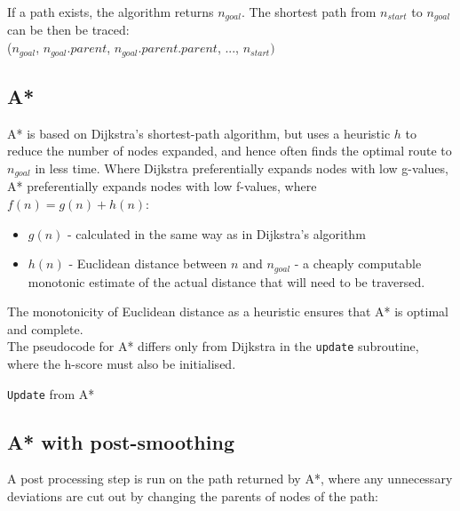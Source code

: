 \documentclass[12pt,notitlepage]{report}
\begin{document}
\noindent
If a path exists, the algorithm returns $n_{goal}$. The shortest path from {$n_{start}$} to {$n_{goal}$} can be then be traced: \\({$n_{goal}$}, {$n_{goal}.parent$}, {$n_{goal}.parent.parent$}, ..., {$n_{start})$}

\subsection {A*}

A* is based on Dijkstra's shortest-path algorithm, but uses a heuristic {$h$} to reduce the number of nodes expanded, and hence often finds the optimal route to {$n_{goal}$} in less time. Where Dijkstra preferentially expands nodes with low g-values, A* preferentially expands nodes with low f-values, where {$f(n) = g(n) + h(n)$}: 
\begin{itemize}
\item {\em {$g(n)$}} - calculated in the same way as in Dijkstra's algorithm
\item {\em {$h(n)$}} - Euclidean distance between {$n$} and {$n_{goal}$}  - a cheaply computable monotonic estimate of the actual distance that will need to be traversed.
\end{itemize}
The monotonicity of Euclidean distance as a heuristic ensures that A* is optimal and complete. \\

\noindent
The pseudocode for A* differs only from Dijkstra in the {\tt update} subroutine, where the h-score must also be initialised.

\begin{algorithm}[htp]
  \SetAlgoLined\DontPrintSemicolon
  \caption{{\tt Update} from {\sc A*}}
\end{algorithm} 

\subsection {A* with post-smoothing}

A post processing step is run on the path returned by A*, where any unnecessary deviations are cut out by changing the parents of nodes of the path:
\end{document}
